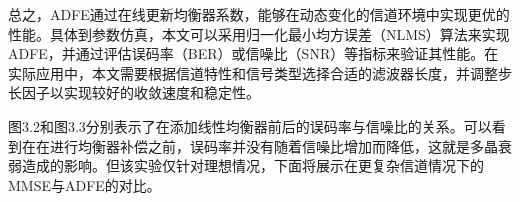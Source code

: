 \documentclass[UTF8,a4paper,12pt]{ctexart}
\numberwithin{equation}{section}
\begin{document}
总之，ADFE通过在线更新均衡器系数，能够在动态变化的信道环境中实现更优的性能。具体到参数仿真，本文可以采用归一化最小均方误差（NLMS）算法来实现ADFE，并通过评估误码率（BER）或信噪比（SNR）等指标来验证其性能。在实际应用中，本文需要根据信道特性和信号类型选择合适的滤波器长度，并调整步长因子以实现较好的收敛速度和稳定性。
\begin{figure}[htb] 
\end{figure}
\begin{figure}[htb] 
\end{figure}
图3.2和图3.3分别表示了在添加线性均衡器前后的误码率与信噪比的关系。可以看到在在进行均衡器补偿之前，误码率并没有随着信噪比增加而降低，这就是多晶衰弱造成的影响。但该实验仅针对理想情况，下面将展示在更复杂信道情况下的MMSE与ADFE的对比。
\end{document}
